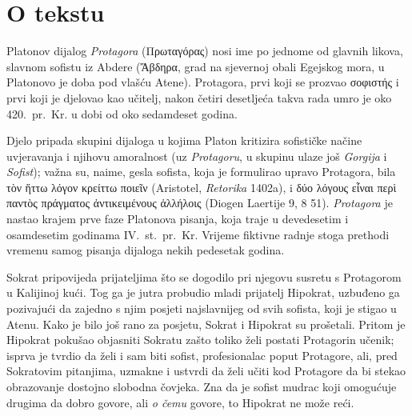 


\section*{O tekstu}

Platonov dijalog \textit{Protagora} (Πρωταγόρας) nosi ime po jednome od glavnih likova, slavnom sofistu iz Abdere (\textgreek[variant=ancient]{Ἄβδηρα}, grad na sjevernoj obali Egejskog mora, u Platonovo je doba pod vlašću Atene). Protagora, prvi koji se prozvao \textgreek[variant=ancient]{σοφιστής} i prvi koji je djelovao kao učitelj, nakon četiri desetljeća takva rada umro je oko 420.\ pr.~Kr. u dobi od oko sedamdeset godina. 

Djelo pripada skupini dijaloga u kojima Platon kritizira sofističke
načine uvjeravanja i njihovu amoralnost (uz \textit{Protagoru}, u skupinu ulaze još \textit{Gorgija} i \textit{Sofist}); važna su, naime, gesla sofista, koja je formulirao upravo Protagora, bila \textgreek[variant=ancient]{τὸν ἥττω λόγον κρείττω ποιεῖν} (Aristotel, \textit{Retorika} 1402a), i \textgreek[variant=ancient]{δύο λόγους εἶναι περὶ παντὸς πράγματος ἀντικειμένους ἀλλήλοις} (Diogen Laertije 9, 8 51). \textit{Protagora} je nastao krajem prve faze Platonova pisanja, koja traje u devedesetim i osamdesetim godinama IV.~st.\ pr.~Kr. Vrijeme fiktivne radnje stoga prethodi vremenu samog pisanja dijaloga nekih pedesetak godina.

Sokrat pripovijeda prijateljima što se dogodilo pri njegovu susretu s Protagorom u Kalijinoj kući. Tog ga je jutra probudio mladi prijatelj Hipokrat, uzbuđeno ga pozivajući da zajedno s njim posjeti najslavnijeg od svih sofista, koji je stigao u Atenu. Kako je bilo još rano za posjetu, Sokrat i Hipokrat su prošetali. Pritom je Hipokrat pokušao objasniti Sokratu zašto toliko želi postati Protagorin učenik; isprva je tvrdio da želi i sam biti sofist, profesionalac poput Protagore, ali, pred Sokratovim pitanjima, uzmakne i ustvrdi da želi učiti kod Protagore da bi stekao obrazovanje dostojno slobodna čovjeka. Zna da je sofist mudrac koji omogućuje drugima da dobro govore, ali \textit{o čemu} govore, to Hipokrat ne može reći.

